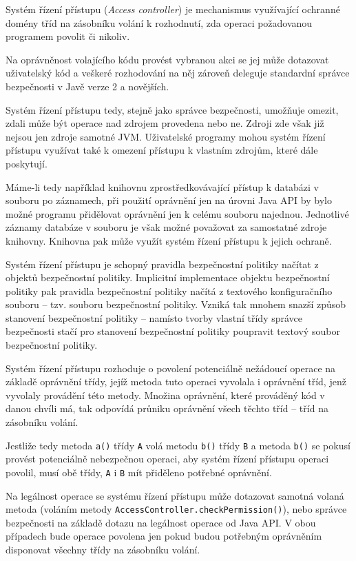 Systém řízení přístupu ({\it Access controller}) je mechanismus využívající ochranné domény tříd na zásobníku volání k rozhodnutí, zda operaci požadovanou programem povolit či nikoliv.

Na oprávněnost volajícího kódu provést vybranou akci se jej může dotazovat uživatelský kód a veškeré rozhodování na něj zároveň deleguje standardní správce bezpečnosti v Javě verze 2 a novějších. \cite[5]{oaks}

Systém řízení přístupu tedy, stejně jako správce bezpečnosti, umožňuje omezit, zdali může být operace nad zdrojem provedena nebo ne. Zdroji zde však již nejsou jen zdroje samotné JVM. Uživatelské programy mohou systém řízení přístupu využívat také k omezení přístupu k vlastním zdrojům, které dále poskytují. \cite[5]{oaks}

Máme-li tedy například knihovnu zprostředkovávající přístup k databázi v souboru po záznamech, při použití oprávnění jen na úrovni Java API by bylo možné programu přidělovat oprávnění jen k celému souboru najednou. Jednotlivé záznamy databáze v souboru je však možné považovat za samostatné zdroje knihovny. Knihovna pak může využít systém řízení přístupu k jejich ochraně.

Systém řízení přístupu je schopný pravidla bezpečnostní politiky načítat z objektů bezpečnostní politiky.
Implicitní implementace objektu bezpečnostní politiky pak pravidla bezpečnostní politiky načítá z textového konfiguračního souboru -- tzv. souboru bezpečnostní politiky.
Vzniká tak mnohem snazší způsob stanovení bezpečnostní politiky -- namísto tvorby vlastní třídy správce bezpečnosti stačí pro stanovení bezpečnostní politiky poupravit textový soubor bezpečnostní politiky. \cite[5]{oaks}

Systém řízení přístupu rozhoduje o povolení potenciálně nežádoucí operace na základě oprávnění třídy, jejíž metoda tuto operaci vyvolala i oprávnění tříd,
jenž vyvolaly provádění této metody.
Množina oprávnění, které prováděný kód v danou chvíli má, tak odpovídá průniku oprávnění všech těchto tříd -- tříd na zásobníku volání.

Jestliže tedy metoda {\tt a()} třídy {\tt A} volá metodu {\tt b()} třídy {\tt B} a metoda {\tt b()} se pokusí provést potenciálně nebezpečnou operaci,
aby systém řízení přístupu operaci povolil, musí obě třídy, {\tt A} i {\tt B} mít přiděleno potřebné oprávnění.

Na legálnost operace se systému řízení přístupu může dotazovat samotná volaná metoda (voláním metody {\tt AccessController.checkPermission()}), nebo správce bezpečnosti na základě dotazu na legálnost operace od Java API. V obou případech bude operace povolena jen pokud budou potřebným oprávněním disponovat všechny třídy na zásobníku volání.

